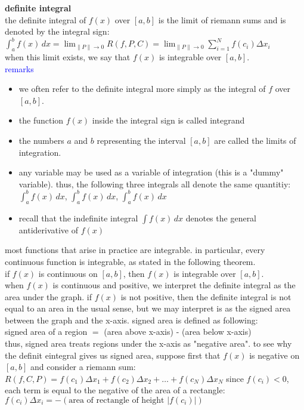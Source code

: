 \documentclass{article}
\begin{document}
\textbf{definite integral}\\
the definite integral of $f(x)$ over $[a, b]$ is the limit of riemann sums and is denoted by the integral sign:\\
$\int_{a}^{b}f(x)\, dx = \lim_{\lVert P\rVert \to 0}R(f, P, C) = \lim_{\lVert P\rVert \to 0}\sum_{i=1}^{N}f(c_i)\Delta x_i$\\
when this limit exists, we say that $f(x)$ is integrable over $[a, b]$.\\

\textcolor{blue}{remarks}
	\begin{itemize}
		\item we often refer to the definite integral more simply as the integral of $f$ over $[a, b]$.
		\item the function $f(x)$ inside the integral sign is called integrand
		\item the numbers $a$ and $b$ representing the interval $[a, b]$ are called the limits of integration.
		\item any variable may be used as a variable of integration (this is a "dummy" variable). thus, the following three integrals all denote the same quantitiy: $\int_{a}^{b}f(x)\,dx$, $\int_{a}^{b}f(x)\,dx$, $\int_{a}^{b}f(x)\,dx$  
		\item recall that the indefinite integral $\int f(x)\, dx$ denotes the general antiderivative of $f(x)$
	\end{itemize}
most functions that arise in practice are integrable. in particular, every continuous function is integrable, as stated in the following theorem.\\
if $f(x)$ is continuous on $[a, b]$, then $f(x)$ is integrable over $[a, b]$.\\

when $f(x)$ is continuous and positive, we interpret the definite integral as the area under the graph. if $f(x)$ is not positive, then the definite integral is not equal to an area in the usual sense, but we may interpret is as the signed area between the graph and the x-axis. signed area is defined as following:\\
signed area of a region $=$ (area above x-axis) - (area below x-axis)\\

thus, signed area treats regions under the x-axis as "negative area". to see why the definit eintegral gives us signed area, suppose first that $f(x)$ is negative on $[a, b]$ and consider a riemann sum: $R(f, C, P) = f(c_1)\Delta x_1 + f(c_2)\Delta x_2 + \ldots + f(c_N)\Delta x_N$ since $f(c_i) < 0$, each term is equal to the negative of the area of a rectangle: $f(c_i)\Delta x_i = -(\text{area of rectangle of height }\lvert f(c_i)\rvert)$\\
\end{document}
